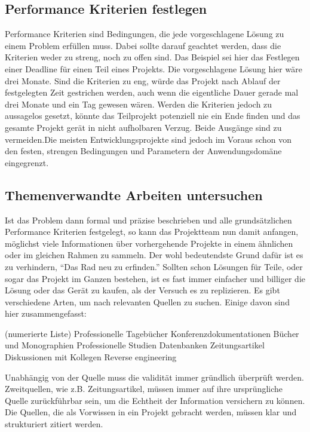     \subsection{Performance Kriterien festlegen}

    Performance Kriterien sind Bedingungen, die jede vorgeschlagene Lösung zu einem Problem erfüllen muss. 
    Dabei sollte darauf geachtet werden, dass die Kriterien weder zu streng, noch zu offen sind. Das 
    Beispiel sei hier das Festlegen einer Deadline für einen Teil eines Projekts. Die vorgeschlagene 
    Lösung hier wäre drei Monate. Sind die Kriterien zu eng, würde das Projekt nach Ablauf der 
    festgelegten Zeit gestrichen werden, auch wenn die eigentliche Dauer gerade mal drei Monate und 
    ein Tag gewesen wären. Werden die Kriterien jedoch zu aussagelos gesetzt, könnte das Teilprojekt 
    potenziell nie ein Ende finden und das gesamte Projekt gerät in nicht aufholbaren Verzug. 
    Beide Ausgänge sind zu vermeiden.Die meisten Entwicklungsprojekte sind jedoch im Voraus schon von den 
    festen, strengen Bedingungen und Parametern der Anwendungsdomäne eingegrenzt.

    \subsection{Themenverwandte Arbeiten untersuchen}

    Ist das Problem dann formal und präzise beschrieben und alle grundsätzlichen Performance 
    Kriterien festgelegt, so kann das Projektteam nun damit anfangen, möglichst viele Informationen 
    über vorhergehende Projekte in einem ähnlichen oder im gleichen Rahmen zu sammeln. Der wohl 
    bedeutendste Grund dafür ist es zu verhindern, “Das Rad neu zu erfinden.” Sollten 
    schon Lösungen für Teile, oder sogar das Projekt im Ganzen bestehen, ist es fast immer 
    einfacher und billiger die Lösung oder das Gerät zu kaufen, als der Versuch es zu replizieren. 
    Es gibt verschiedene Arten, um nach relevanten Quellen zu suchen. Einige davon sind hier 
    zusammengefasst:

        (numerierte Liste)
        Professionelle Tagebücher
        Konferenzdokumentationen
        Bücher und Monographien
        Professionelle Studien 
        Datenbanken
        Zeitungsartikel
        Diskussionen mit Kollegen
        Reverse engineering

    Unabhängig von der Quelle muss die validität immer gründlich überprüft werden. 
    Zweitquellen, wie z.B. Zeitungsartikel, müssen immer auf ihre ursprüngliche Quelle 
    zurückführbar sein, um die Echtheit der Information versichern zu können. Die Quellen, die 
    als Vorwissen in ein Projekt gebracht werden, müssen klar und strukturiert zitiert werden.

